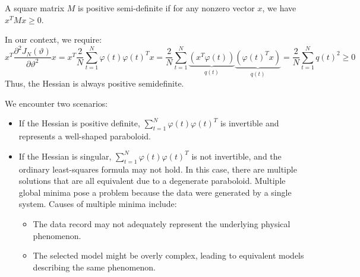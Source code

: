 \begin{definition}
    A square matrix $M$ is positive semi-definite if for any nonzero vector $x$, we have $x^TMx \geq 0$.
\end{definition}
In our context, we require:
\[x^T\frac{\partial^2 J_N(\vartheta)}{\partial\vartheta^2}x=x^T\dfrac{2}{N}\sum_{t=1} ^{N} \varphi(t)\varphi(t)^T x=\dfrac{2}{N}\sum_{t=1} ^{N} \underbrace{\left(x^T\varphi(t)\right)}_{q(t)}  \underbrace{\left(\varphi(t)^Tx\right)}_{q(t)}=\dfrac{2}{N}\sum_{t=1}^{N} q(t)^2 \geq 0\]
Thus, the Hessian is always positive semidefinite.

We encounter two scenarios:
\begin{itemize}
    \item If the Hessian is positive definite, $\sum_{t=1}^{N} \varphi(t)\varphi(t)^T$ is invertible and represents a well-shaped paraboloid.
    \item If the Hessian is singular, $\sum_{t=1} ^{N} \varphi(t)\varphi(t)^T$ is not invertible, and the ordinary least-squares formula may not hold.
        In this case, there are multiple solutions that are all equivalent due to a degenerate paraboloid. 
        Multiple global minima pose a problem because the data were generated by a single system. 
        Causes of multiple minima include:
        \begin{itemize}
            \item The data record may not adequately represent the underlying physical phenomenon.
            \item The selected model might be overly complex, leading to equivalent models describing the same phenomenon.
        \end{itemize}
\end{itemize}